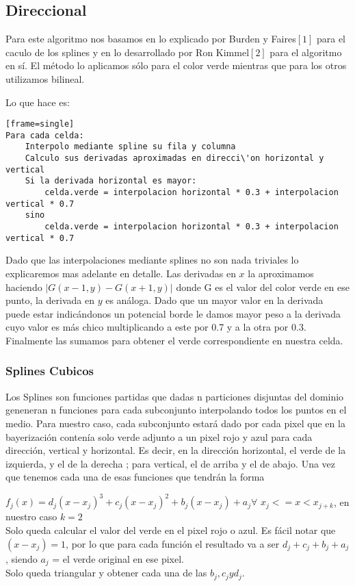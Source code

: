\subsection{Direccional}

Para este algoritmo nos basamos en lo explicado por Burden y Faires$[1]$ para el caculo de los splines y en lo desarrollado por Ron Kimmel$[2]$ para el algoritmo en sí. El método lo aplicamos sólo para el color verde mientras que para los otros utilizamos bilineal. 

Lo que hace es:
\begin{verbatim}[frame=single] 
Para cada celda:
	Interpolo mediante spline su fila y columna
	Calculo sus derivadas aproximadas en direcci\'on horizontal y vertical
	Si la derivada horizontal es mayor:
		celda.verde = interpolacion horizontal * 0.3 + interpolacion vertical * 0.7
	sino
		celda.verde = interpolacion horizontal * 0.3 + interpolacion vertical * 0.7
\end{verbatim}

Dado que las interpolaciones mediante splines no son nada triviales lo explicaremos mas adelante en detalle. Las derivadas en $x$  la aproximamos haciendo $|G(x-1,y)-G(x+1,y)|$ donde G es el valor del color verde en ese punto, la derivada en $y$ es análoga. Dado que un mayor valor en la derivada puede estar indicándonos un potencial borde le damos mayor peso a la derivada cuyo valor es más chico multiplicando a este por 0.7 y a la otra por 0.3. Finalmente las sumamos para obtener el verde correspondiente en nuestra celda.

\subsubsection{Splines Cubicos}
Los Splines son funciones partidas que dadas n particiones disjuntas del dominio geneneran n funciones para cada subconjunto interpolando todos los puntos en el medio. Para nuestro caso, cada subconjunto estará dado por cada pixel que en la bayerización contenía solo verde adjunto a un pixel rojo y azul para cada dirección, vertical y horizontal. Es decir, en la dirección horizontal, el verde de la izquierda, y el de la derecha ; para vertical, el de arriba y el de abajo. 
Una vez que tenemos cada una de esas funciones que tendrán la forma

$f_j(x) = d_j(x-x_j)^3 + c_j(x-x_j)^2 + b_j(x-x_j) + a_j \forall$ $x_j <= x < x_{j+k}$, en nuestro caso $k = 2$ \\

Solo queda calcular el valor del verde en el pixel rojo o azul.
Es fácil notar que $(x-x_j) = 1$, por lo que para cada función el resultado va a ser $d_j+c_j+b_j+a_j$, siendo $a_j$ = el verde original en ese pixel.\\
Solo queda triangular y obtener cada una de las $b_j,c_j y d_j$.


